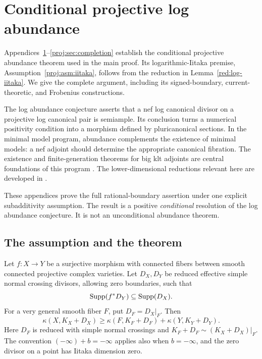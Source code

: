 \section{Conditional projective log abundance}\label{proj:sec:introduction}

Appendices~\ref{proj:sec:introduction}--\ref{proj:sec:completion}
establish the conditional projective abundance theorem used in the main
proof. Its logarithmic-Iitaka premise,
Assumption~\ref{proj:asm:iitaka}, follows from the reduction in Lemma~\ref{red:log-iitaka}. We give the complete argument, including
its signed-boundary, current-theoretic, and Frobenius constructions.



The log abundance conjecture asserts that a nef log canonical divisor
on a projective log canonical pair is semiample. Its conclusion turns a
numerical positivity condition into a morphism defined by pluricanonical
sections. In the minimal model program, abundance complements the
existence of minimal models: a nef adjoint should determine the
appropriate canonical fibration. The existence and finite-generation
theorems for big klt adjoints are central foundations of this program
\cite{BCHM}. The lower-dimensional reductions relevant here are
developed in \cite{Proj-Hashizume2018,Proj-FujinoGongyoRings2014}.

These appendices prove the full rational-boundary assertion under one
explicit subadditivity assumption. The result is a positive
\emph{conditional} resolution of the log abundance conjecture.
It is not an unconditional abundance theorem.

\subsection{The assumption and the theorem}

\begin{assumption}\label{proj:asm:iitaka}
Let \(f:X\to Y\) be a surjective morphism with connected fibers between
smooth connected projective complex varieties. Let \(D_X,D_Y\) be
reduced effective simple normal crossing divisors, allowing zero
boundaries, such that
\[
  \operatorname{Supp}(f^*D_Y)\subseteq\operatorname{Supp}(D_X).
\]
For a very general smooth fiber \(F\), put \(D_F=D_X|_F\). Then
\[
 \kappa(X,K_X+D_X)\ge
 \kappa(F,K_F+D_F)+\kappa(Y,K_Y+D_Y).
\]
Here \(D_F\) is reduced with simple normal crossings and
\(K_F+D_F\sim(K_X+D_X)|_F\). The convention
\((-\infty)+b=-\infty\) applies also when \(b=-\infty\), and the zero
divisor on a point has Iitaka dimension zero.
\end{assumption}

